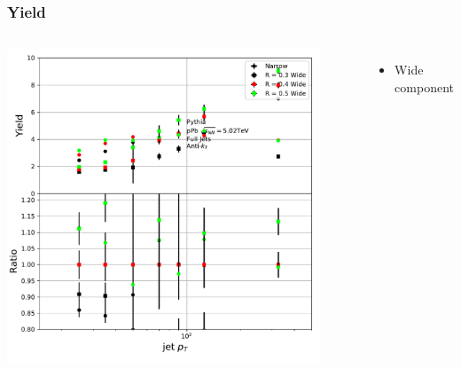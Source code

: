 \documentclass{beamer}
\begin{document}
\begin{frame}
\frametitle{Yield}
\begin{columns}
\includegraphics[width=0.90\textwidth]{RcomparisonYield.pdf} 
\begin{itemize}
\item Wide component
\end{itemize}
\end{columns}
\end{frame}
\end{document}
